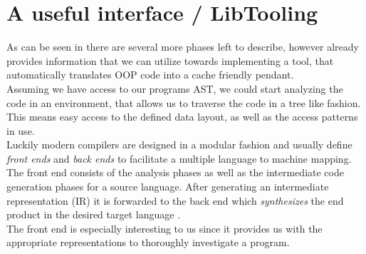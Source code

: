 \section{A useful interface / LibTooling}\label{a_usfl_int}
As can be seen in  there are several more phases left to describe, however  already provides information that we can utilize towards implementing a tool, that automatically translates OOP code into a cache friendly pendant.\\
Assuming we have access to our programs AST, we could start analyzing the code in an environment, that allows us to traverse the code in a tree like fashion. This means easy access to the defined data layout, as well as the access patterns in use.\\
Luckily modern compilers are designed in a modular fashion and usually define \textit{front ends} and \textit{back ends} to facilitate a multiple language to machine mapping. The front end consists of the analysis phases as well as the intermediate code generation phases for a source language. After generating an intermediate representation (IR) it is forwarded to the back end which \textit{synthesizes} the end product in the desired target language .\\
The front end is especially interesting to us since it provides us with the appropriate representations to thoroughly investigate a program.

